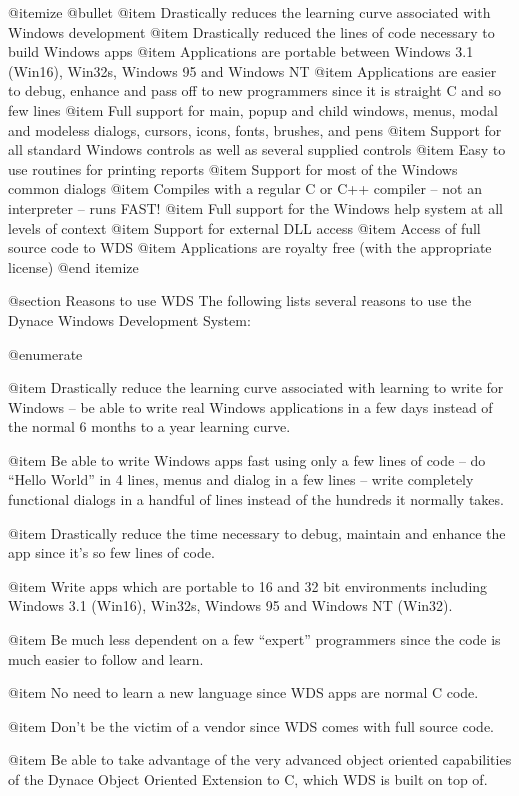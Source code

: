 @itemize @bullet
@item Drastically reduces the learning curve associated with Windows
development
@item Drastically reduced the lines of code necessary to build Windows apps
@item Applications are portable between Windows 3.1 (Win16), Win32s,
Windows 95 and Windows NT
@item Applications are easier to debug, enhance and pass off to new programmers
since it is straight C and so few lines
@item Full support for main, popup and child windows, menus,
modal and modeless dialogs, cursors, icons, fonts, brushes, and pens
@item Support for all standard Windows controls as well as several supplied controls
@item Easy to use routines for printing reports
@item Support for most of the Windows common dialogs
@item Compiles with a regular C or C++ compiler -- not an interpreter -- 
runs FAST!
@item Full support for the Windows help system at all levels of context
@item Support for external DLL access
@item Access of full source code to WDS
@item Applications are royalty free (with the appropriate license)
@end itemize

@section Reasons to use WDS
The following lists several reasons to use the Dynace Windows
Development System:

@enumerate

@item
Drastically reduce the learning curve associated with learning to
write for Windows -- be able to write real Windows applications in
a few days instead of the normal 6 months to a year learning curve.

@item
Be able to write Windows apps fast using only a few lines of code --
do ``Hello World'' in 4 lines, menus and dialog in a few lines -- write
completely functional dialogs in a handful of lines instead of the
hundreds it normally takes.

@item
Drastically reduce the time necessary to debug, maintain and enhance the
app since it's so few lines of code.

@item
Write apps which are portable to 16 and 32 bit environments including
Windows 3.1 (Win16), Win32s, Windows 95 and Windows NT (Win32).

@item
Be much less dependent on a few ``expert'' programmers since the code
is much easier to follow and learn.

@item
No need to learn a new language since WDS apps are normal C code.

@item
Don't be the victim of a vendor since WDS comes with full source code.

@item
Be able to take advantage of the very advanced object oriented
capabilities of the Dynace Object Oriented Extension to C, which
WDS is built on top of.

